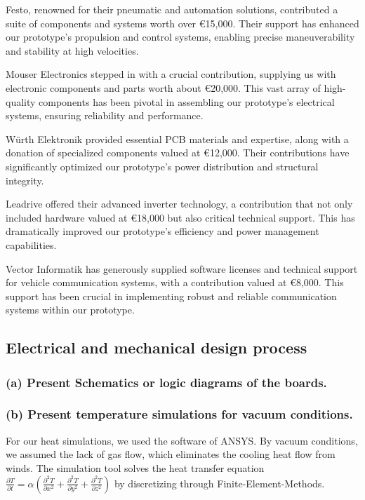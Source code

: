 Festo, renowned for their pneumatic and automation solutions, contributed a suite of components and systems worth over \euro 15,000. Their support has enhanced our prototype's propulsion and control systems, enabling precise maneuverability and stability at high velocities.

Mouser Electronics stepped in with a crucial contribution, supplying us with electronic components and parts worth about \euro 20,000. This vast array of high-quality components has been pivotal in assembling our prototype's electrical systems, ensuring reliability and performance.

Würth Elektronik provided essential PCB materials and expertise, along with a donation of specialized components valued at \euro 12,000. Their contributions have significantly optimized our prototype's power distribution and structural integrity.

Leadrive offered their advanced inverter technology, a contribution that not only included hardware valued at \euro 18,000 but also critical technical support. This has dramatically improved our prototype's efficiency and power management capabilities.

Vector Informatik has generously supplied software licenses and technical support for vehicle communication systems, with a contribution valued at \euro 8,000. This support has been crucial in implementing robust and reliable communication systems within our prototype.


\subsection{Electrical and mechanical design process}
\subsubsection{(a) Present Schematics or logic diagrams of the boards.}
\subsubsection{(b) Present temperature simulations for vacuum conditions.}
For our heat simulations, we used the software of ANSYS. By vacuum conditions, we assumed the
lack of gas flow, which eliminates the cooling heat flow from winds. The simulation tool solves
the heat transfer equation \( \frac{\partial T}{\partial t} = \alpha \left( \frac{\partial^2 T}{\partial x^2} + \frac{\partial^2 T}{\partial y^2} + \frac{\partial^2 T}{\partial z^2} \right) \)
by discretizing through Finite-Element-Methods.

